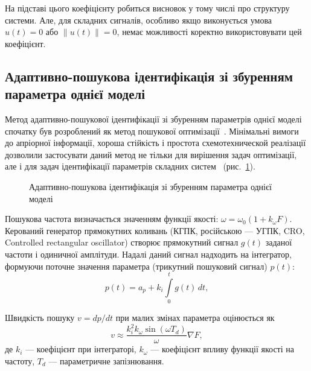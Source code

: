 На підставі цього коефіцієнту робиться висновок у тому числі
про структуру системи.
Але, для складних сигналів, особливо якщо виконується умова
$u(t)=0$ або $\|u(t)\| = 0$,
немає можливості коректно використовувати цей коефіцієнт.



\subsection{Адаптивно-пошукова ідентифікація зі збуренням параметра однієї моделі} %

Метод адаптивно-пошукової ідентифікації зі збуренням параметрів
однієї моделі спочатку був розроблений як метод пошукової
оптимізації~\cite{ivah_int_meth_direct,rastr_seu,kras_dyn_nsn,borcov}.
Мінімальні вимоги до апріорної інформації, хороша стійкість і
простота схемотехнической реалізації дозволили застосувати
даний метод не тільки для вирішення задач оптимізації, але
і для задач ідентифікації параметрів складних систем
\cite{mich_92,mai_adopt_meth_direct,mai_iss_adop_alg_etalon}~(рис.~\ref{atu:f:apid1}).

\begin{figure}[htb!]
\begin{center}

\end{center}
\caption{Адаптивно-пошукова ідентифікація зі збуренням параметра однієї моделі}
\label{atu:f:apid1}
\end{figure}

Пошукова частота визначається значенням функції якості:
\( \omega = \omega_0 ( 1 + k_\omega F ) \).
Керований генератор прямокутних коливань
(КГПК, російською --- УГПК, CRO, Controlled rectangular oscillator)
створює прямокутний сигнал $g(t)$ заданої частоти і одиничної
амплітуди. Надалі даний сигнал надходить на інтегратор, формуючи
поточне значення параметра (трикутний пошуковий сигнал) $p(t)$:
%
\begin{equation}
 p(t) = a_p + k_i \int\limits_{0}^{t} g(t) \, dt ,
\label{atu:eq:api_integr}
\end{equation}

Швидкість пошуку
$ v = dp / dt $ при малих змінах параметра оцінюється як
%
\begin{equation}
\label{atu:eq:vasi}
  v
  \approx
  \frac{k_i^2 k_\omega \sin(\omega T_d) }{\omega} \nabla {F},
\end{equation}
%
де
$ k_i $ --- коефіцієнт при інтеграторі,
$ k_\omega $ --- коефіцієнт впливу функції якості на частоту,
$ T_d $ --- параметричне запізнювання.

